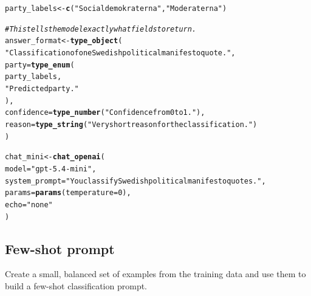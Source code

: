 \documentclass[11pt,a4paper,english]{article}\usepackage[]{graphicx}\usepackage[]{xcolor}
\makeatletter
\newcommand{\hlnum}[1]{\textcolor[rgb]{0.686,0.059,0.569}{#1}}%
\newcommand{\hlsng}[1]{\textcolor[rgb]{0.192,0.494,0.8}{#1}}%
\newcommand{\hlcom}[1]{\textcolor[rgb]{0.678,0.584,0.686}{\textit{#1}}}%
\newcommand{\hldef}[1]{\textcolor[rgb]{0.345,0.345,0.345}{#1}}%
\newcommand{\hlkwb}[1]{\textcolor[rgb]{0.69,0.353,0.396}{#1}}%
\newcommand{\hlkwc}[1]{\textcolor[rgb]{0.333,0.667,0.333}{#1}}%
\newcommand{\hlkwd}[1]{\textcolor[rgb]{0.737,0.353,0.396}{\textbf{#1}}}%
\newenvironment{kframe}{%
 \def\at@end@of@kframe{}%
 \ifinner\ifhmode%
  \def\at@end@of@kframe{\end{minipage}}%
  \begin{minipage}{\columnwidth}%
 \fi\fi%
 \def\FrameCommand##1{\hskip\@totalleftmargin \hskip-\fboxsep
 \colorbox{shadecolor}{##1}\hskip-\fboxsep
     \hskip-\linewidth \hskip-\@totalleftmargin \hskip\columnwidth}%
 \MakeFramed {\advance\hsize-\width
   \@totalleftmargin\z@ \linewidth\hsize
   \@setminipage}}%
 {\par\unskip\endMakeFramed%
 \at@end@of@kframe}
\newenvironment{knitrout}{}{} %
\makeatother
\begin{document}
\begin{knitrout}\small
{}\color{fgcolor}\begin{kframe}
\begin{alltt}
\hldef{party_labels} \hlkwb{<-} \hlkwd{c}\hldef{(}\hlsng{"Socialdemokraterna"}\hldef{,} \hlsng{"Moderaterna"}\hldef{)}

\hlcom{# This tells the model exactly what fields to return.}
\hldef{answer_format} \hlkwb{<-} \hlkwd{type_object}\hldef{(}
  \hlsng{"Classification of one Swedish political manifesto quote."}\hldef{,}
  \hlkwc{party} \hldef{=} \hlkwd{type_enum}\hldef{(}
    \hldef{party_labels,}
    \hlsng{"Predicted party."}
  \hldef{),}
  \hlkwc{confidence} \hldef{=} \hlkwd{type_number}\hldef{(}\hlsng{"Confidence from 0 to 1."}\hldef{),}
  \hlkwc{reason} \hldef{=} \hlkwd{type_string}\hldef{(}\hlsng{"Very short reason for the classification."}\hldef{)}
\hldef{)}

\hldef{chat_mini} \hlkwb{<-} \hlkwd{chat_openai}\hldef{(}
  \hlkwc{model} \hldef{=} \hlsng{"gpt-5.4-mini"}\hldef{,}
  \hlkwc{system_prompt} \hldef{=} \hlsng{"You classify Swedish political manifesto quotes."}\hldef{,}
  \hlkwc{params} \hldef{=} \hlkwd{params}\hldef{(}\hlkwc{temperature} \hldef{=} \hlnum{0}\hldef{),}
  \hlkwc{echo} \hldef{=} \hlsng{"none"}
\hldef{)}
\end{alltt}
\end{kframe}
\end{knitrout}

\subsection{Few-shot prompt}

Create a small, balanced set of examples from the training data and use them to build a few-shot classification prompt.
\end{document}
